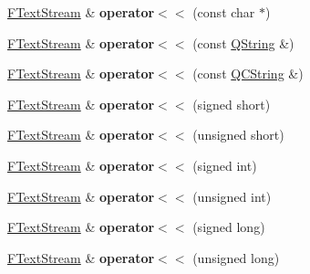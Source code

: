 \begin{DoxyCompactItemize}
\item 
\hypertarget{class_f_text_stream_a18a376dd9dbf35080e71a29ad359828b}{\hyperlink{class_f_text_stream}{F\-Text\-Stream} \& {\bfseries operator$<$$<$} (const char $\ast$)}\label{class_f_text_stream_a18a376dd9dbf35080e71a29ad359828b}

\item 
\hypertarget{class_f_text_stream_a65f52b345d81364d7b020389bc81085b}{\hyperlink{class_f_text_stream}{F\-Text\-Stream} \& {\bfseries operator$<$$<$} (const \hyperlink{class_q_string}{Q\-String} \&)}\label{class_f_text_stream_a65f52b345d81364d7b020389bc81085b}

\item 
\hypertarget{class_f_text_stream_a03d08c65a80bb128425f4b65aa938989}{\hyperlink{class_f_text_stream}{F\-Text\-Stream} \& {\bfseries operator$<$$<$} (const \hyperlink{class_q_c_string}{Q\-C\-String} \&)}\label{class_f_text_stream_a03d08c65a80bb128425f4b65aa938989}

\item 
\hypertarget{class_f_text_stream_a261a638bb2486eacdc463e0a1c596afd}{\hyperlink{class_f_text_stream}{F\-Text\-Stream} \& {\bfseries operator$<$$<$} (signed short)}\label{class_f_text_stream_a261a638bb2486eacdc463e0a1c596afd}

\item 
\hypertarget{class_f_text_stream_aa44f7955f5268a03efdb715479ce0194}{\hyperlink{class_f_text_stream}{F\-Text\-Stream} \& {\bfseries operator$<$$<$} (unsigned short)}\label{class_f_text_stream_aa44f7955f5268a03efdb715479ce0194}

\item 
\hypertarget{class_f_text_stream_a7575ffde2d5cec9d8f0d2bed01de93c2}{\hyperlink{class_f_text_stream}{F\-Text\-Stream} \& {\bfseries operator$<$$<$} (signed int)}\label{class_f_text_stream_a7575ffde2d5cec9d8f0d2bed01de93c2}

\item 
\hypertarget{class_f_text_stream_af05c56758928920d5dea42d5496ee5ef}{\hyperlink{class_f_text_stream}{F\-Text\-Stream} \& {\bfseries operator$<$$<$} (unsigned int)}\label{class_f_text_stream_af05c56758928920d5dea42d5496ee5ef}

\item 
\hypertarget{class_f_text_stream_a574e6dc62c8cd0ff87dc998968ad86d6}{\hyperlink{class_f_text_stream}{F\-Text\-Stream} \& {\bfseries operator$<$$<$} (signed long)}\label{class_f_text_stream_a574e6dc62c8cd0ff87dc998968ad86d6}

\item 
\hypertarget{class_f_text_stream_ac89d5b33f6af573dbefdba9ff5c2c2bf}{\hyperlink{class_f_text_stream}{F\-Text\-Stream} \& {\bfseries operator$<$$<$} (unsigned long)}\label{class_f_text_stream_ac89d5b33f6af573dbefdba9ff5c2c2bf}


\end{DoxyCompactItemize}
